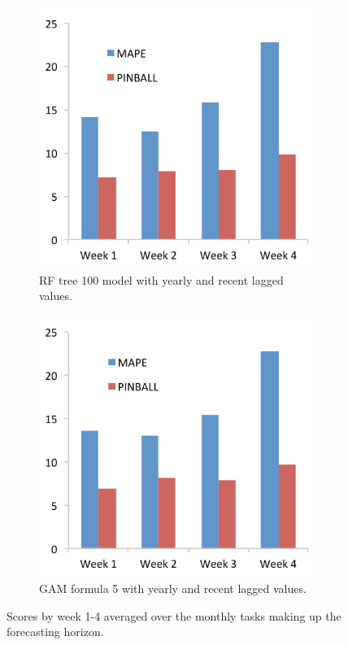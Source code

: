 \documentclass[conference]{IEEEtran}
\begin{document}
\begin{figure}[!ht]
\centering
\begin{subfigure}[b]{.49\linewidth}
\includegraphics[width=\linewidth]{gfx/results/load/LOAD-WEEKS-MAPE-PINBALL.pdf}
\caption{RF tree 100 model with yearly and recent lagged values.}
\label{subfig:acf-temp-1year}
\end{subfigure}
\begin{subfigure}[b]{.49\linewidth}
\includegraphics[width=\linewidth]{gfx/results/load/LOAD-WEEKS-MAPE-PINBALL-GAM.pdf}
\caption{GAM formula 5 with yearly and recent lagged values.}
\label{subfig:acf-load-1year}
\end{subfigure}
\caption{Scores by week 1-4 averaged over the monthly tasks making up the forecasting horizon.}
\label{fig:load-weeks}
\end{figure}
\end{document}
